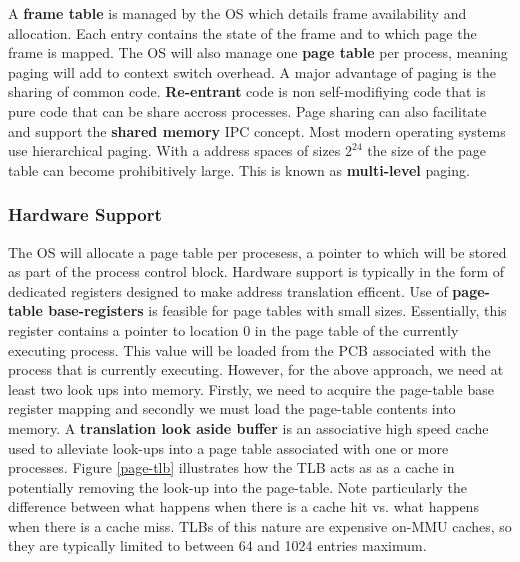 \documentclass[10pt,a4paper]{article}
\begin{document}
A {\bf frame table} is managed by the OS which details frame availability and allocation. Each entry contains the state of the frame and to which page the frame is mapped. The OS will also manage one {\bf page table} per process, meaning paging will add to context switch overhead. 
\newline\newline 
A major advantage of paging is the sharing of common code. {\bf Re-entrant} code is non self-modifiying code that is pure code that can be share accross processes. Page sharing can also facilitate and support the {\bf shared memory} IPC concept. Most modern operating systems use hierarchical paging. With a address spaces of sizes $2^24$ the size of the page table can become prohibitively large. This is known as {\bf multi-level} paging. 
\subsubsection{Hardware Support}
The OS will allocate a page table per procesess, a pointer to which will be stored as part of the process control block. Hardware support is typically in the form of dedicated registers designed to make address translation efficent. Use of {\bf page-table base-registers} is feasible for page tables with small sizes. Essentially, this register contains a pointer to location 0 in the page table of the currently executing process. This value will be loaded from the PCB associated with the process that is currently executing. 
\newline\newline
However, for the above approach, we need at least two look ups into memory. Firstly, we need to acquire the page-table base register mapping and secondly we must load the page-table contents into memory. A {\bf translation look aside buffer} is an associative high speed cache used to alleviate look-ups into a page table associated with one or more processes. Figure \ref{page-tlb} illustrates how the TLB acts as as a cache in potentially removing the look-up into the page-table. Note particularly the difference between what happens when there is a cache hit vs. what happens when there is a cache miss.
\newline\newline
TLBs of this nature are expensive on-MMU caches, so they are typically limited to between 64 and 1024 entries maximum.
\end{document}
